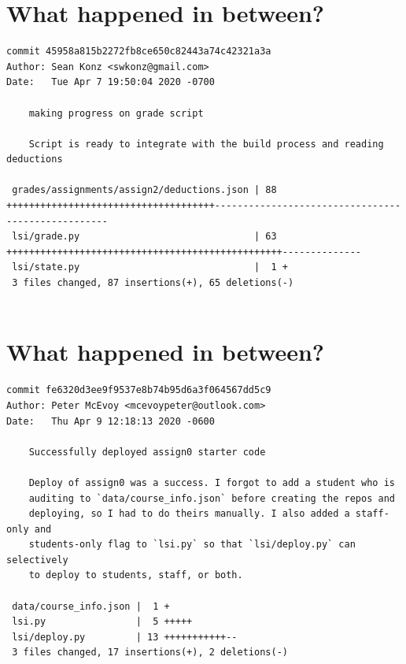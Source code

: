 \documentclass{article}
\begin{document}
\newpage

\section*{What happened in between?}
\vspace{2ex}
\begin{verbatim}
commit 45958a815b2272fb8ce650c82443a74c42321a3a
Author: Sean Konz <swkonz@gmail.com>
Date:   Tue Apr 7 19:50:04 2020 -0700

    making progress on grade script

    Script is ready to integrate with the build process and reading deductions

 grades/assignments/assign2/deductions.json | 88 +++++++++++++++++++++++++++++++++++++---------------------------------------------------
 lsi/grade.py                               | 63 +++++++++++++++++++++++++++++++++++++++++++++++++--------------
 lsi/state.py                               |  1 +
 3 files changed, 87 insertions(+), 65 deletions(-)


\end{verbatim}

\newpage

\section*{What happened in between?}
\vspace{2ex}
\begin{verbatim}
commit fe6320d3ee9f9537e8b74b95d6a3f064567dd5c9
Author: Peter McEvoy <mcevoypeter@outlook.com>
Date:   Thu Apr 9 12:18:13 2020 -0600

    Successfully deployed assign0 starter code
    
    Deploy of assign0 was a success. I forgot to add a student who is
    auditing to `data/course_info.json` before creating the repos and
    deploying, so I had to do theirs manually. I also added a staff-only and
    students-only flag to `lsi.py` so that `lsi/deploy.py` can selectively
    to deploy to students, staff, or both.

 data/course_info.json |  1 +
 lsi.py                |  5 +++++
 lsi/deploy.py         | 13 +++++++++++--
 3 files changed, 17 insertions(+), 2 deletions(-)

\end{verbatim}

\newpage
\end{document}
